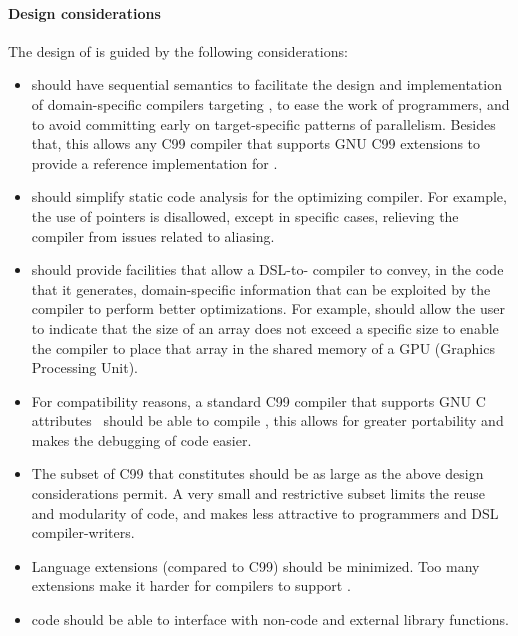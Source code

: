 \paragraph*{Design considerations}
The design of \pencil is guided by the following considerations:
\begin{itemize}
\item \pencil should have sequential semantics to facilitate the
  design and implementation of domain-specific compilers targeting
  \pencil, to ease the work of \pencil programmers, and to avoid committing
  early on target-specific patterns of parallelism.
  Besides that, this allows any C99 compiler that supports GNU C99 extensions
  to provide a reference implementation for \pencil.

\item \pencil should simplify static code analysis for the optimizing compiler.
  For example, the use of pointers is disallowed, except in specific cases,
  relieving the compiler from issues related to aliasing.

\item \pencil should provide facilities that allow a DSL-to-\pencil
  compiler to convey, in the \pencil code that it generates,
  domain-specific information that can be exploited by the
  compiler to perform better optimizations.  For example, \pencil
  should allow the user to indicate that the size of an array does not
  exceed a specific size to enable the compiler to place
  that array in the shared memory of a GPU (Graphics Processing Unit).

\item For compatibility reasons, a standard C99 compiler that supports
  GNU C attributes~\cite{gccguide} should be able to compile \pencil, this allows for
  greater portability and makes the debugging of \pencil code easier.

\item The subset of C99 that constitutes \pencil should
  be as large as the above design  considerations permit.
  A very small and restrictive subset limits the reuse and
  modularity of \pencil code, and makes
  \pencil less attractive to programmers and
  DSL compiler-writers.

\item Language extensions (compared to C99) should be minimized.
  Too many extensions make it harder for compilers
  to support \pencil.

\item \pencil code should be able to interface with non-\pencil code
  and external library functions.
\end{itemize}

